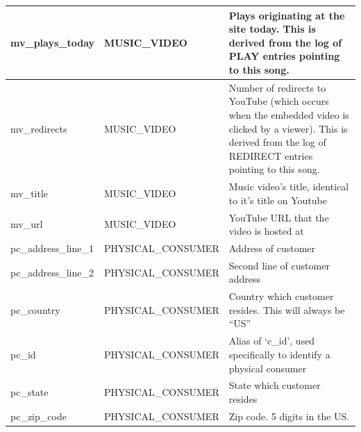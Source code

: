 \documentclass[11pt, a4paper]{report}
\begin{document}
\begin{longtable}{|l|p{4.4cm}|p{7cm}|}
mv\_plays\_today        & MUSIC\_VIDEO            & Plays originating at the site today. This is derived from the log of PLAY entries pointing to this song.                                                              \\ \hline
mv\_redirects           & MUSIC\_VIDEO            & Number of redirects to YouTube (which occurs when the embedded video is clicked by a viewer). This is derived from the log of REDIRECT entries pointing to this song. \\ \hline
mv\_title               & MUSIC\_VIDEO            & Music video’s title, identical to it’s title on Youtube                                                                                                               \\ \hline
mv\_url                 & MUSIC\_VIDEO            & YouTube URL that the video is hosted at                                                                                                                               \\ \hline
pc\_address\_line\_1    & PHYSICAL\_CONSUMER      & Address of customer                                                                                                                                                   \\ \hline
pc\_address\_line\_2    & PHYSICAL\_CONSUMER      & Second line of customer address                                                                                                                                       \\ \hline
pc\_country             & PHYSICAL\_CONSUMER      & Country which customer resides. This will always be ``US''                                                                                                            \\ \hline
pc\_id                  & PHYSICAL\_CONSUMER      & Alias of `c\_id', used specifically to identify a physical consumer                                                                                                   \\ \hline
pc\_state               & PHYSICAL\_CONSUMER      & State which customer resides                                                                                                                                          \\ \hline
pc\_zip\_code           & PHYSICAL\_CONSUMER      & Zip code. 5 digits in the US.                                                                                                                                         \\ \hline

\end{longtable}
\end{document}
